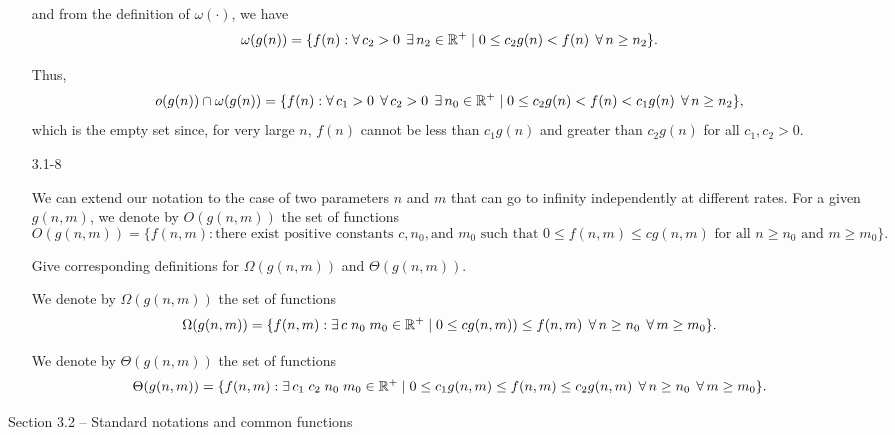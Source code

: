 \begin{enumerate}
\begin{framed}
and from the definition of $\omega(\cdot)$, we have
\[
\omega(g(n)) = \{ f(n) : \operatorname{\forall} c_2 > 0\;\operatorname{\exists} n_2\in\mathbb{R}^+ \mid
                  0 \le c_2g(n) < f(n)\;\operatorname{\forall} n \ge n_2 \}.
\]

Thus,
\[
o(g(n)) \cap \omega(g(n)) =
\{ f(n) : \operatorname{\forall} c_1 > 0\;\operatorname{\forall} c_2>0\;\operatorname{\exists} n_0\in\mathbb{R}^+\mid
   0 \le c_2g(n) < f(n) < c_1g(n)\;\operatorname{\forall} n \ge n_2 \},
\]
which is the empty set since, for very large $n$, $f(n)$ cannot be less than
$c_1 g(n)$ and greater than $c_2 g(n)$ for all $c_1, c_2 > 0$.

\end{framed}

\item[3.1{-}8]{We can extend our notation to the case of two parameters $n$ and
$m$ that can go to infinity independently at different rates. For a given
$g(n, m)$, we denote by $O(g(n, m))$ the set of functions
\[
O(g(n, m)) = \{{f(n, m) : \text{there exist positive constants } c, n_0,
\text{and\ } m_0 \text{\ such that\ } 0 \le f(n, m) \le c g(n, m)
\text{\ for all\ } n \ge n_0 \text{\ and\ } m \ge m_0}\}.
\]

Give corresponding definitions for $\Omega(g(n, m))$ and $\Theta(g(n, m))$.
}

\begin{framed}
We denote by $\Omega(g(n, m))$ the set of functions
\[
\Omega(g(n, m)) = \{f(n, m) : \operatorname{\exists} c\;n_0\;m_0 \in \mathbb{R}^+ \mid
                    0 \le cg(n, m)) \le f(n, m)\;
                    \operatorname{\forall} n \ge n_0\;\operatorname{\forall} m \ge m_0\}.
\]

We denote by $\Theta(g(n, m))$ the set of functions
\[
\Theta(g(n, m)) = \{f(n, m) : \operatorname{\exists} c_1\;c_2\;n_0\;m_0\in\mathbb{R}^+\mid
                    0 \le c_1g(n, m) \le f(n, m) \le c_2g(n, m)\;
                    \operatorname{\forall} n \ge n_0\;\operatorname{\forall} m \ge m_0\}.
\]
\end{framed}

\end{enumerate}

\newpage

{\large Section 3.2 {--} Standard notations and common functions}

